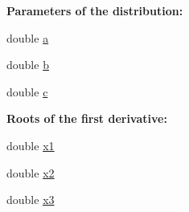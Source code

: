 \begin{Indent}{\bf Parameters of the distribution\+:}\par
\begin{DoxyCompactItemize}
\item 
double \hyperlink{class_p_c_a_1_1_double_well_rand_a2291611a2ea4d9c3ee50a904c2fea9b7}{a}
\item 
double \hyperlink{class_p_c_a_1_1_double_well_rand_a289b59fbd571f8f377888f48a8c6b8ae}{b}
\item 
double \hyperlink{class_p_c_a_1_1_double_well_rand_a855b2106b6b692f9e837ef282b658c85}{c}
\end{DoxyCompactItemize}
\end{Indent}
\begin{Indent}{\bf Roots of the first derivative\+:}\par
\begin{DoxyCompactItemize}
\item 
double \hyperlink{class_p_c_a_1_1_double_well_rand_ab624775bcfb6b575ae1aa099bcd78cd7}{x1}
\item 
double \hyperlink{class_p_c_a_1_1_double_well_rand_a116879814f1ddd7bfc1efc3c11bf8c5b}{x2}
\item 
double \hyperlink{class_p_c_a_1_1_double_well_rand_a2ac7d1cea509a918639ccb8bef3f1d0a}{x3}
\end{DoxyCompactItemize}
\end{Indent}
